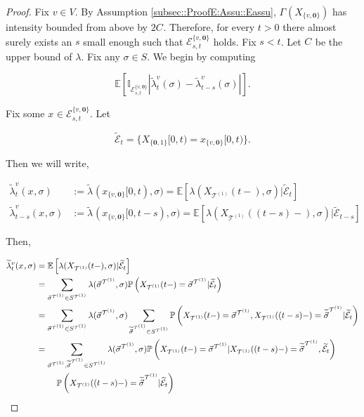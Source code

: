 \documentclass[12pt]{article}
\newcommand{\mb}{\mathbb}
\newcommand{\mc}{\mathcal}
\newcommand{\pr}{\mb{P}}							%
\newcommand{\ex}[1]{\mb{E}\left[#1\right]}			%
\renewcommand{\root}{\mathbf{0}}				%
\renewcommand{\v}{v}							%
\renewcommand{\S}{S}							%
\newcommand{\s}{\sigma}							%
\newcommand{\sv}{\vec{\s}}						%
\newcommand{\x}{x}								%
\renewcommand{\t}{t}							%
\renewcommand{\tt}{s}							%
\newcommand{\X}{X}								%
\newcommand{\vind}[1]{^{#1}}					%
\newcommand{\carp}[1]{^{#1}}					%
\newcommand{\vsi}[1]{^{#1}}						%
\newcommand{\cind}[1]{_{#1}}					%
\newcommand{\tp}[1]{(#1)}						%
\newcommand{\tip}[1]{#1}						%
\newcommand{\ts}[1]{_{#1}}						%
\newcommand{\const}{C}							%
\newcommand{\tree}{\mc{T}}						%
\newcommand{\sln}[1]{^{(#1)}}					%
\newcommand{\rate}{\lambda}						%
\newcommand{\alt}[1]{\widetilde{#1}}			%
\newcommand{\indx}[1]{_{#1}}					%
\newcommand{\evnt}{\mc{E}}						%
\newcommand{\pmap}{\Gamma}						%
\newcommand{\crate}{\alt{\lambda}}				%
\begin{document}
\begin{proof}
Fix \(\v\in V\). By Assumption \ref{subsec::ProofE:Assu::Eassu}, \(\pmap\vind{}(\X\cind{\{\v,\root\}}\tip{})\) has intensity bounded from above by \(2\const\indx{}\). Therefore, for every \(\t > 0\) there almost surely exists an \(\tt\) small enough such that \(\evnt^{\{\v,\root\}}_{\tt,\t}\) holds. Fix \(\tt < \t\). Let \(\const\indx{}\) be the upper bound of \(\rate\). Fix any \(\s\in \S\). We begin by computing

\[\ex{\mb{I}_{\evnt^{\{\v,\root\}}_{\tt,\t}}|\crate\vind{\v}\ts{\t}(\s) - \crate\vind{\v}\ts{\t-\tt}(\s)|}.\]

Fix some \(\x\cind{}\tip{}\in \evnt^{\{\v,\root\}}_{\tt,\t}\). Let 

\[\alt{\evnt}\ts{\t} = \{\X\cind{\{\root,1\}}\tip{[0,\t)} = \x\cind{\{\v,\root\}}\tip{[0,\t)}\}.\]

Then we will write,

\begin{align*}
\crate\vind{\v}\ts{\t}(\x\cind{}\tip{},\s) &:=\crate\vind{}\ts{}(\x\cind{\{\v,\root\}}\tip{[0,\t)},\s) = \ex{\rate(\X\cind{\tree\sln{1}}\tp{\t-},\s)|\alt{\evnt}\ts{\t}}\\
\crate\vind{\v}\ts{\t-\tt}(\x\cind{}\tip{},\s) &:= \crate\vind{}\ts{}(\x\cind{\{\v,\root\}}\tip{[0,\t-\tt)},\s) = \ex{\rate(\X\cind{\tree\sln{1}}\tp{(\t-\tt)-},\s)|\alt{\evnt}\ts{\t-\tt}}
\end{align*}

Then,

\begin{align*}
\crate\vind{\v}\ts{\t}(\x\cind{}\tip{},\s) &= \ex{\rate(\X\cind{\tree\sln{1}}\tp{\t-},\s)|\alt{\evnt}\ts{\t}}\\
&= \sum_{\sv\cind{}\vsi{\tree\sln{1}} \in \S\carp{\tree\sln{1}}} \rate(\sv\cind{}\vsi{\tree\sln{1}},\s)\pr\left(\X\cind{\tree\sln{1}}\tp{\t-} = \sv\cind{}\vsi{\tree\sln{1}}|\alt{\evnt}\ts{\t}\right)\\
&= \sum_{\sv\cind{}\vsi{\tree\sln{1}} \in \S\carp{\tree\sln{1}}} \rate(\sv\cind{}\vsi{\tree\sln{1}},\s) \sum_{\alt{\sv}\cind{}\vsi{\tree\sln{1}} \in \S\carp{\tree\sln{1}}} \pr\left(\X\cind{\tree\sln{1}}\tp{\t-} = \sv\cind{}\vsi{\tree\sln{1}},\X\cind{\tree\sln{1}}\tp{(\t-\tt)-} = \alt{\sv}\cind{}\vsi{\tree\sln{1}}|\alt{\evnt}\ts{\t}\right)\\
&= \sum_{\sv\cind{}\vsi{\tree\sln{1}},\alt{\sv}\cind{}\vsi{\tree\sln{1}} \in \S\carp{\tree\sln{1}}} \rate(\sv\cind{}\vsi{\tree\sln{1}},\s)\pr\left(\X\cind{\tree\sln{1}}\tp{\t-} = \sv\cind{}\vsi{\tree\sln{1}}|\X\cind{\tree\sln{1}}\tp{(\t-\tt)-}=\alt{\sv}\cind{}\vsi{\tree\sln{1}},\alt{\evnt}\ts{\t}\right)\\
&\hspace{24 pt}\pr\left(\X\cind{\tree\sln{1}}\tp{(\t-\tt)-}=\alt{\sv}\cind{}\vsi{\tree\sln{1}}|\alt{\evnt}\ts{\t}\right)\\
\end{align*}


\end{proof}
\end{document}
